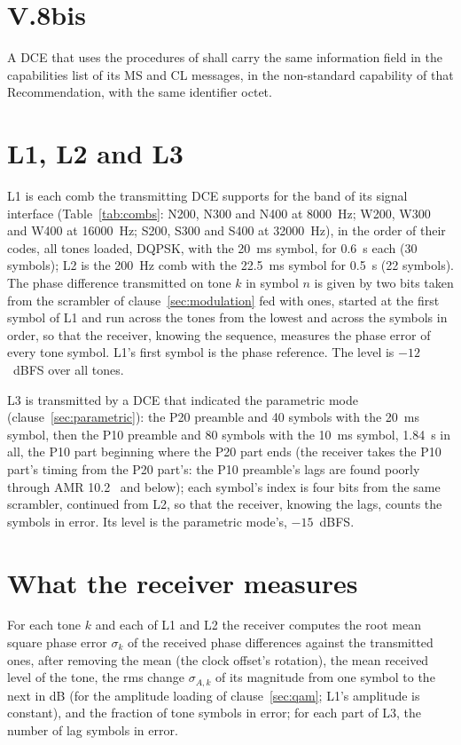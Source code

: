 
\section{V.8bis}
A DCE that uses the procedures of  shall carry the same
information field in the capabilities list of its MS and CL messages, in
the non-standard capability of that Recommendation, with the same
identifier octet.

\section{L1, L2 and L3}
L1 is each comb the transmitting DCE supports for the band of its
signal interface (Table~\ref{tab:combs}: N200, N300 and N400 at
8000~Hz; W200, W300 and W400 at 16000~Hz; S200, S300 and S400 at
32000~Hz), in the order of their codes, all tones loaded, DQPSK, with the
20~ms symbol, for 0.6~s each (30 symbols); L2 is the 200~Hz comb with the
22.5~ms symbol for 0.5~s (22 symbols).  The
phase difference transmitted on tone $k$ in symbol $n$ is given by two
bits taken from the scrambler of clause~\ref{sec:modulation} fed with
ones, started at the first symbol of L1 and run across the tones from the
lowest and across the symbols in order, so that the receiver, knowing
the sequence, measures the phase error of every tone symbol.  L1's first
symbol is the phase reference.  The level is $-12$~dBFS over all tones.

L3 is transmitted by a DCE that indicated the parametric mode
(clause~\ref{sec:parametric}): the P20 preamble and 40 symbols with the
20~ms symbol, then the P10 preamble and 80 symbols with the 10~ms
symbol, 1.84~s in all, the P10 part beginning where the P20 part ends
(the receiver takes the P10 part's timing from the P20 part's: the P10
preamble's lags are found poorly through AMR 10.2~\kbs{} and below); each symbol's index is four bits from the same
scrambler, continued from L2, so that the receiver, knowing the lags,
counts the symbols in error.  Its level is the parametric mode's,
$-15$~dBFS.

\section{What the receiver measures}
For each tone $k$ and each of L1 and L2 the receiver computes the root
mean square phase error $\sigma_k$ of the received phase differences
against the transmitted ones, after removing the mean (the clock offset's
rotation), the mean received level of the tone, the rms change
$\sigma_{A,k}$ of its magnitude from one symbol to the next in dB (for the
amplitude loading of clause~\ref{sec:qam}; L1's amplitude is constant),
and the fraction of tone symbols in error; for each part of L3, the
number of lag symbols in error.

